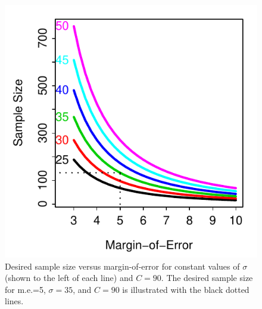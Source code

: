 \documentclass[10pt,openany]{book}\usepackage[]{graphicx}\usepackage[]{color}
\newenvironment{knitrout}{}{} %
\begin{document}
\begin{knitrout}
\color{fgcolor}\begin{figure}[hbtp]

{\centering \includegraphics[width=.4\linewidth]{Figs/SampleSizeSigma-1} 

}

\caption[Desired sample size versus margin-of-error for constant values of $\sigma$ (shown to the left of each line) and $C=90$]{Desired sample size versus margin-of-error for constant values of $\sigma$ (shown to the left of each line) and $C=90$.  The desired sample size for m.e.=5, $\sigma=35$, and $C=90$ is illustrated with the black dotted lines.}\label{fig:SampleSizeSigma}
\end{figure}


\end{knitrout}
\end{document}
